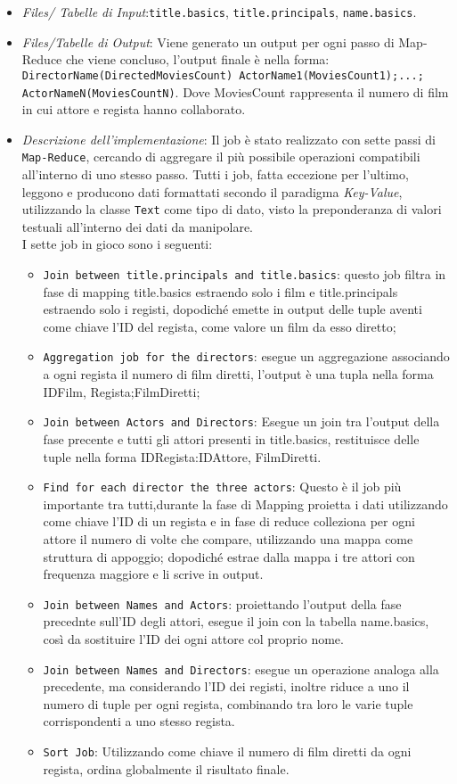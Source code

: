\documentclass[hidelinks]{article}
\begin{document}
\begin{itemize}
	\item \textit{Files/ Tabelle di Input}:\texttt{title.basics}, \texttt{title.principals}, \texttt{name.basics}.
	\item \textit{Files/Tabelle di Output}: Viene generato un output per ogni passo di Map-Reduce che viene concluso, l'output finale è nella forma: 
	\texttt{DirectorName(DirectedMoviesCount)    ActorName1(MoviesCount1);...; ActorNameN(MoviesCountN)}.
	Dove MoviesCount rappresenta il numero di film in cui attore e regista hanno collaborato.
	\item \textit{Descrizione dell'implementazione}: Il job è stato realizzato con sette passi di \texttt{Map-Reduce}, cercando di aggregare il più possibile operazioni compatibili all'interno di uno stesso passo. Tutti i job, fatta eccezione per l'ultimo, leggono e producono dati formattati secondo il paradigma \textit{Key-Value}, utilizzando la classe \texttt{Text} come tipo di dato, visto la preponderanza di valori testuali all'interno dei dati da manipolare.\\
	I sette job in gioco sono i seguenti: 
		\begin{itemize}
		\item \texttt{Join between title.principals and title.basics}: questo job filtra in fase di mapping title.basics estraendo solo i film e title.principals estraendo solo i registi, dopodiché emette in output delle tuple aventi come chiave l'ID del regista, come valore un film da esso diretto;
		\item \texttt{Aggregation job for the directors}: esegue un aggregazione associando a ogni regista il numero di film diretti, l'output è una tupla nella forma IDFilm, Regista;FilmDiretti;
		\item  \texttt{Join between Actors and Directors}: Esegue un join tra l'output della fase precente e tutti gli attori presenti in title.basics, restituisce delle tuple nella forma IDRegista:IDAttore, FilmDiretti.
		\item \texttt{Find for each director the three actors}: Questo è il job più importante tra tutti,durante la fase di Mapping proietta i dati utilizzando come chiave l'ID di un regista e in fase di reduce colleziona per ogni attore il numero di volte che compare, utilizzando una mappa come struttura di appoggio; dopodiché estrae dalla mappa i tre attori con frequenza maggiore e li scrive in output.
		\item  \texttt{Join between Names and Actors}: proiettando l'output della fase precednte sull'ID degli attori, esegue il join con la tabella name.basics, così da sostituire l'ID dei ogni attore col proprio nome.
		\item \texttt{Join between Names and Directors}: esegue un operazione analoga alla precedente, ma considerando l'ID dei registi, inoltre riduce a uno il numero di tuple per ogni regista, combinando tra loro le varie tuple corrispondenti a uno stesso regista.
		\item \texttt{Sort Job}: Utilizzando come chiave il numero di film diretti da ogni regista, ordina globalmente il risultato finale.
		

\end{itemize}
\end{itemize}
\end{document}
